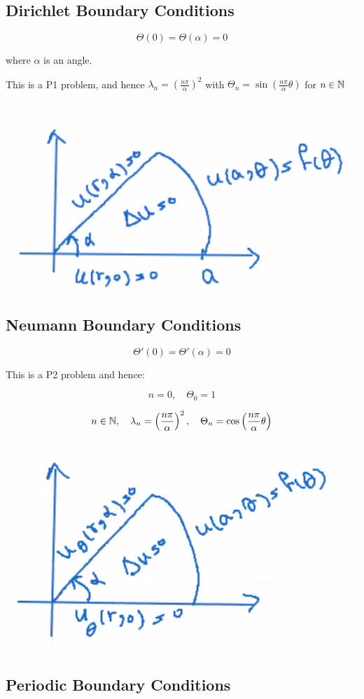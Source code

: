 \documentclass{article}
\begin{document}
\subsection{Dirichlet Boundary Conditions}

$$\Theta(0) = \Theta(\alpha) = 0$$

where $\alpha$ is an angle.

This is a P1 problem, and hence $\lambda_n = \left( \frac{n \pi}{\alpha} \right)^2$ with $\Theta_n = \sin \left( \frac{n \pi}{\alpha} \theta \right)$ for $n \in \mathbb{N}$

\begin{center}
    \includegraphics[width = 0.6 \textwidth]{2.png}
\end{center}

\subsection{Neumann Boundary Conditions}

$$\Theta' (0) = \Theta' (\alpha) = 0$$

This is a P2 problem and hence:

$$n = 0, \quad \Theta_0 = 1$$

$$n \in \mathbb{N}, \quad \lambda_n = \left( \frac{n \pi}{\alpha} \right)^2, \quad \Theta_n = \cos \left( \frac{n \pi}{\alpha} \theta \right)$$

\begin{center}
    \includegraphics[width = 0.6 \textwidth]{3.png}
\end{center}

\subsection{Periodic Boundary Conditions}
\end{document}
